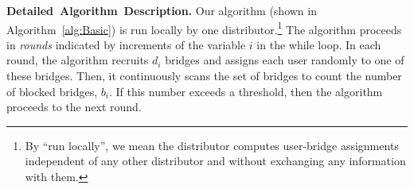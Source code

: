\documentclass[letterpaper,twocolumn,10pt]{article}
\newcommand{\sfsize}{\fontsize{0.68\baselineskip}{0.68\baselineskip}\selectfont}
\newcommand{\sans}[1]{\textbf{\textsf{\sfsize \mbox{#1}}}}
\newcommand{\para}[1]{\vspace{0.55em} \noindent \sans{{\mbox{#1}}}}
\begin{document}



\para{Detailed Algorithm Description.}
Our algorithm (shown in Algorithm~\ref{alg:Basic}) is run locally by one distributor.\footnote{By ``run locally'', we mean the distributor computes user-bridge assignments independent of any other distributor and without exchanging any information with them.} 
The algorithm proceeds in \emph{rounds} indicated by increments of the variable $i$ in the while loop.
In each round, the algorithm recruits $d_i$ bridges and assigns each user randomly to one of these bridges. Then, it continuously scans the set of bridges to count the number of blocked bridges, $b_i$. If this number exceeds a threshold, then the algorithm proceeds to the next round. %
\end{document}
